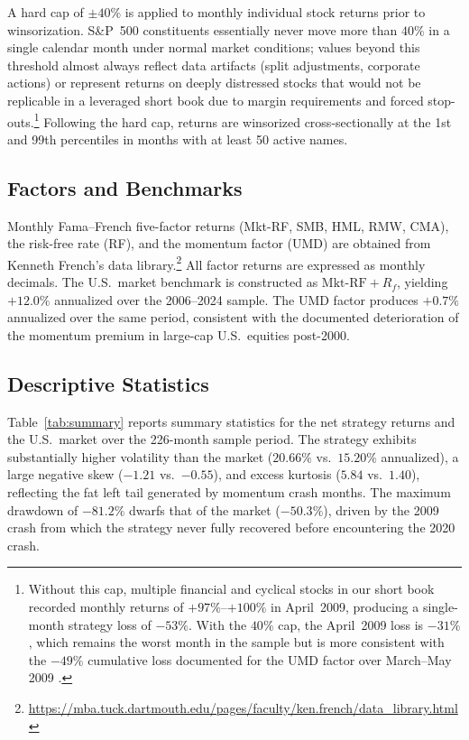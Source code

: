 \documentclass[11pt]{article}
\begin{document}
A hard cap of $\pm40\%$ is applied to monthly individual stock returns prior to
winsorization. S\&P~500 constituents essentially never move more than $40\%$ in a
single calendar month under normal market conditions; values beyond this threshold
almost always reflect data artifacts (split adjustments, corporate actions) or
represent returns on deeply distressed stocks that would not be replicable in a leveraged
short book due to margin requirements and forced stop-outs.\footnote{Without this cap,
multiple financial and cyclical stocks in our short book recorded monthly returns of
$+97\%$--$+100\%$ in April~2009, producing a single-month strategy loss of $-53\%$.
With the $40\%$ cap, the April~2009 loss is $-31\%$, which remains the worst month in
the sample but is more consistent with the $-49\%$ cumulative loss documented for the
UMD factor over March--May 2009 \citep{Daniel2016}.} Following the hard cap, returns
are winsorized cross-sectionally at the 1st and 99th percentiles in months with at
least 50 active names.

\subsection{Factors and Benchmarks}

Monthly Fama--French five-factor returns (Mkt-RF, SMB, HML, RMW, CMA), the risk-free
rate (RF), and the momentum factor (UMD) are obtained from Kenneth French's data
library.\footnote{\url{https://mba.tuck.dartmouth.edu/pages/faculty/ken.french/data_library.html}}
All factor returns are expressed as monthly decimals. The U.S.\ market benchmark is
constructed as $\text{Mkt-RF} + R_f$, yielding $+12.0\%$ annualized over the
2006--2024 sample. The UMD factor produces $+0.7\%$ annualized over the same period,
consistent with the documented deterioration of the momentum premium in large-cap
U.S.\ equities post-2000.

\subsection{Descriptive Statistics}

Table~\ref{tab:summary} reports summary statistics for the net strategy returns and
the U.S.\ market over the 226-month sample period. The strategy exhibits substantially
higher volatility than the market ($20.66\%$ vs.\ $15.20\%$ annualized), a large
negative skew ($-1.21$ vs.\ $-0.55$), and excess kurtosis ($5.84$ vs.\ $1.40$),
reflecting the fat left tail generated by momentum crash months. The maximum drawdown
of $-81.2\%$ dwarfs that of the market ($-50.3\%$), driven by the 2009 crash from
which the strategy never fully recovered before encountering the 2020 crash.
\end{document}
